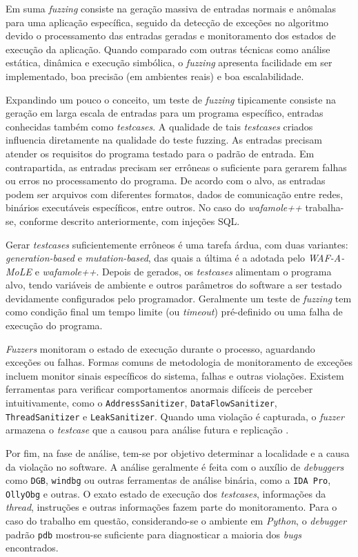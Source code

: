 Em suma \textit{fuzzing} consiste na geração massiva de entradas normais e anômalas para uma aplicação específica, seguido da detecção de exceções no algoritmo devido o processamento das entradas geradas e monitoramento dos estados de execução da aplicação. Quando comparado com outras técnicas como análise estática, dinâmica e execução simbólica, o \textit{fuzzing} apresenta facilidade em ser implementado, boa precisão (em ambientes reais) e boa escalabilidade.

Expandindo um pouco o conceito, um teste de \textit{fuzzing} tipicamente consiste na geração em larga escala de entradas para um programa específico, entradas conhecidas também como \textit{testcases}. A qualidade de tais \textit{testcases} criados influencia diretamente na qualidade do teste fuzzing. As entradas precisam atender os requisitos do programa testado para o padrão de entrada. Em contrapartida, as entradas precisam ser errôneas o suficiente para gerarem falhas ou erros no processamento do programa. De acordo com o alvo, as entradas podem ser arquivos com diferentes formatos, dados de comunicação entre redes, binários executáveis específicos, entre outros. No caso do \textit{wafamole++} trabalha-se, conforme descrito anteriormente, com injeções SQL.

Gerar \textit{testcases} suficientemente errôneos é uma tarefa árdua, com duas variantes: \textit{generation-based} e \textit{mutation-based}, das quais a última é a adotada pelo \textit{WAF-A-MoLE} e \textit{wafamole++}. Depois de gerados, os \textit{testcases} alimentam o programa alvo, tendo variáveis de ambiente e outros parâmetros do software a ser testado devidamente configurados pelo programador. Geralmente um teste de \textit{fuzzing} tem como condição final um tempo limite (ou \textit{timeout}) pré-definido ou uma falha de execução do programa.

\textit{Fuzzers} monitoram o estado de execução durante o processo, aguardando exceções ou falhas.  Formas comuns de metodologia de monitoramento de exceções incluem monitor sinais específicos do sistema, falhas e outras violações. Existem ferramentas para verificar comportamentos anormais difíceis de perceber intuitivamente, como o \verb+AddressSanitizer+, \verb+DataFlowSanitizer+, \verb+ThreadSanitizer+ e \verb+LeakSanitizer+. Quando uma violação é capturada, o \textit{fuzzer} armazena o \textit{testcase} que a causou para análise futura e replicação \cite{li2018fuzzing}.

Por fim, na fase de análise, tem-se por objetivo determinar a localidade e a causa da violação no software. A análise geralmente é feita com o auxílio de \textit{debuggers} como \verb+DGB+, \verb+windbg+ ou outras ferramentas de análise binária, como a \verb+IDA Pro+, \verb+OllyObg+ e outras. O exato estado de execução dos \textit{testcases}, informações da \textit{thread}, instruções e outras informações fazem parte do monitoramento. Para o caso do trabalho em questão, considerando-se o ambiente em \textit{Python}, o \textit{debugger} padrão \verb+pdb+ mostrou-se suficiente para diagnosticar a maioria dos \textit{bugs} encontrados.

